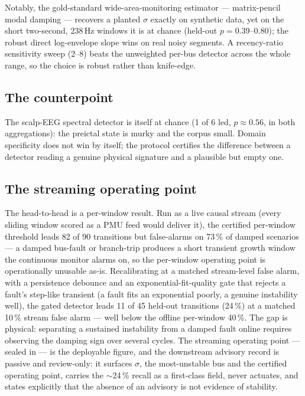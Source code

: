 \documentclass[11pt]{article}
\begin{document}
Notably, the gold-standard wide-area-monitoring estimator ---
matrix-pencil modal damping --- recovers a planted $\sigma$ exactly on
synthetic data, yet on the short two-second, 238\,Hz windows it is at
chance (held-out $p = 0.39$--$0.80$); the robust direct log-envelope
slope wins on real noisy segments. A recency-ratio sensitivity sweep
(2--8) beats the unweighted per-bus detector across the whole range, so
the choice is robust rather than knife-edge.

\subsection{The counterpoint}

The scalp-EEG spectral detector is itself at chance (1 of 6 led,
$p \approx 0.56$, in both aggregations): the preictal state is murky
and the corpus small. Domain specificity does not win by itself; the
protocol certifies the difference between a detector reading a genuine
physical signature and a plausible but empty one.

\subsection{The streaming operating point}\label{sec:stream}

The head-to-head is a per-window result. Run as a live causal stream
(every sliding window scored as a PMU feed would deliver it), the
certified per-window threshold leads 82 of 90 transitions but
false-alarms on 73\,\% of damped scenarios --- a damped bus-fault or
branch-trip produces a short transient growth window the continuous
monitor alarms on, so the per-window operating point is operationally
unusable as-is. Recalibrating at a matched stream-level false alarm,
with a persistence debounce and an exponential-fit-quality gate that
rejects a fault's step-like transient (a fault fits an exponential
poorly, a genuine instability well), the gated detector leads 11 of 45
held-out transitions (24\,\%) at a matched 10\,\% stream false alarm
--- well below the offline per-window 40\,\%. The gap is physical:
separating a sustained instability from a damped fault online requires
observing the damping sign over several cycles. The streaming operating
point --- sealed in
--- is the deployable figure, and the downstream advisory record is
passive and review-only: it surfaces $\sigma$, the most-unstable bus
and the certified operating point, carries the $\sim$24\,\% recall as a
first-class field, never actuates, and states explicitly that the
absence of an advisory is not evidence of stability.
\end{document}
